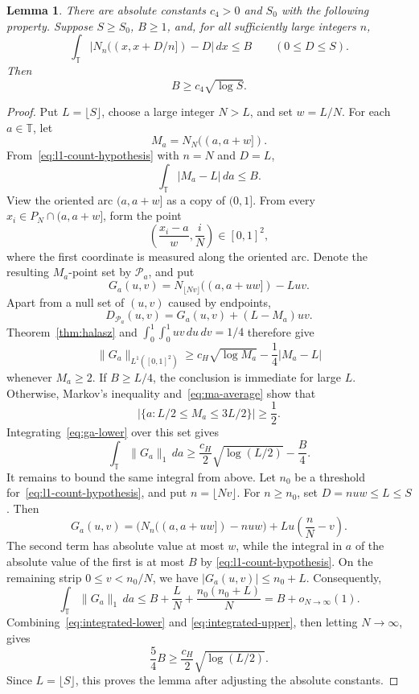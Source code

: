 \documentclass[11pt]{article}
\newtheorem{lemma}[theorem]{Lemma}
\theoremstyle{remark}
\numberwithin{equation}{section}
\newcommand{\T}{\mathbb{T}}
\begin{document}
\begin{lemma}\label{lem:l1-localization}
There are absolute constants $c_4>0$ and $S_0$ with the following
property. Suppose $S\geq S_0$, $B\geq1$, and, for all sufficiently large
integers $n$,
\begin{equation}\label{eq:l1-count-hypothesis}
  \int_{\T}\left|N_n((x,x+D/n])-D\right|\,dx\leq B
  \qquad(0\leq D\leq S).
\end{equation}
Then
\[
  B\geq c_4\sqrt{\log S}.
\]
\end{lemma}
\begin{proof}
Put $L=\lfloor S\rfloor$, choose a large integer $N>L$, and set $w=L/N$.
For each $a\in\T$, let
\[
  M_a=N_N((a,a+w]).
\]
From~\eqref{eq:l1-count-hypothesis} with $n=N$ and $D=L$,
\begin{equation}\label{eq:ma-average}
  \int_{\T}|M_a-L|\,da\leq B.
\end{equation}
View the oriented arc $(a,a+w]$ as a copy of $(0,1]$. From every
$x_i\in P_N\cap(a,a+w]$, form the point
\[
  \left(\frac{x_i-a}{w},\frac{i}{N}\right)\in[0,1]^2,
\]
where the first coordinate is measured along the oriented arc. Denote
the resulting $M_a$-point set by $\mathcal P_a$, and put
\[
  G_a(u,v)
  =N_{\lfloor Nv\rfloor}((a,a+uw])-Luv.
\]
Apart from a null set of $(u,v)$ caused by endpoints,
\[
  D_{\mathcal P_a}(u,v)
  =G_a(u,v)+(L-M_a)uv.
\]
Theorem~\ref{thm:halasz} and
$\int_0^1\int_0^1uv\,du\,dv=1/4$ therefore give
\begin{equation}\label{eq:ga-lower}
  \|G_a\|_{L^1([0,1]^2)}
  \geq c_H\sqrt{\log M_a}-\frac14|M_a-L|
\end{equation}
whenever $M_a\geq2$.
If $B\geq L/4$, the conclusion is immediate for large $L$. Otherwise,
Markov's inequality and~\eqref{eq:ma-average} show that
\[
  \bigl|\{a:L/2\leq M_a\leq3L/2\}\bigr|\geq\frac12.
\]
Integrating~\eqref{eq:ga-lower} over this set gives
\begin{equation}\label{eq:integrated-lower}
  \int_{\T}\|G_a\|_1\,da
  \geq\frac{c_H}{2}\sqrt{\log(L/2)}-\frac B4.
\end{equation}
It remains to bound the same integral from above. Let $n_0$ be a threshold
for~\eqref{eq:l1-count-hypothesis}, and put
$n=\lfloor Nv\rfloor$. For $n\geq n_0$, set
$D=nuw\leq L\leq S$. Then
\[
  G_a(u,v)
  =\bigl(N_n((a,a+uw])-nuw\bigr)
    +Lu\left(\frac nN-v\right).
\]
The second term has absolute value at most $w$, while the integral in $a$
of the absolute value of the first is at most $B$ by
\eqref{eq:l1-count-hypothesis}. On the remaining strip
$0\leq v<n_0/N$, we have $|G_a(u,v)|\leq n_0+L$. Consequently,
\begin{equation}\label{eq:integrated-upper}
  \int_{\T}\|G_a\|_1\,da
  \leq B+\frac LN+\frac{n_0(n_0+L)}N
  =B+o_{N\to\infty}(1).
\end{equation}
Combining~\eqref{eq:integrated-lower} and
\eqref{eq:integrated-upper}, then letting $N\to\infty$, gives
\[
  \frac54B\geq\frac{c_H}{2}\sqrt{\log(L/2)}.
\]
Since $L=\lfloor S\rfloor$, this proves the lemma after adjusting the
absolute constants.
\end{proof}
\end{document}
